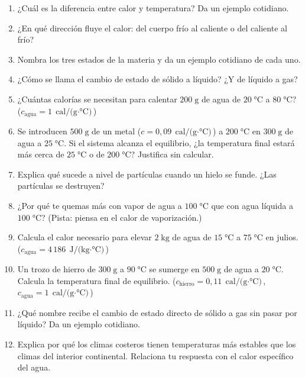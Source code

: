 \documentclass[12pt, letterpaper]{article}
\begin{document}
\begin{enumerate}[leftmargin=*, resume]
  \item \facil{} ¿Cuál es la diferencia entre calor y temperatura? Da un ejemplo cotidiano.

  \item \facil{} ¿En qué dirección fluye el calor: del cuerpo frío al caliente o del caliente al frío?

  \item \facil{} Nombra los tres estados de la materia y da un ejemplo cotidiano de cada uno.

  \item \facil{} ¿Cómo se llama el cambio de estado de sólido a líquido? ¿Y de líquido a gas?

  \item \medio{} ¿Cuántas calorías se necesitan para calentar $200\;\text{g}$ de agua de $20\;°\text{C}$ a $80\;°\text{C}$? ($c_{\text{agua}} = 1\;\text{cal/(g$\cdot$°C)}$)

  \item \medio{} Se introducen $500\;\text{g}$ de un metal ($c = 0{,}09\;\text{cal/(g$\cdot$°C)}$) a $200\;°\text{C}$ en $300\;\text{g}$ de agua a $25\;°\text{C}$. Si el sistema alcanza el equilibrio, ¿la temperatura final estará más cerca de $25\;°\text{C}$ o de $200\;°\text{C}$? Justifica sin calcular.

  \item \medio{} Explica qué sucede a nivel de partículas cuando un hielo se funde. ¿Las partículas se destruyen?

  \item \medio{} ¿Por qué te quemas más con vapor de agua a $100\;°\text{C}$ que con agua líquida a $100\;°\text{C}$? (Pista: piensa en el calor de vaporización.)

  \item \dificil{} Calcula el calor necesario para elevar $2\;\text{kg}$ de agua de $15\;°\text{C}$ a $75\;°\text{C}$ en julios. ($c_{\text{agua}} = 4\,186\;\text{J/(kg$\cdot$°C)}$)

  \item \dificil{} Un trozo de hierro de $300\;\text{g}$ a $90\;°\text{C}$ se sumerge en $500\;\text{g}$ de agua a $20\;°\text{C}$. Calcula la temperatura final de equilibrio. ($c_{\text{hierro}} = 0{,}11\;\text{cal/(g$\cdot$°C)}$, $c_{\text{agua}} = 1\;\text{cal/(g$\cdot$°C)}$)

  \item \dificil{} ¿Qué nombre recibe el cambio de estado directo de sólido a gas sin pasar por líquido? Da un ejemplo cotidiano.

  \item \dificil{} Explica por qué los climas costeros tienen temperaturas más estables que los climas del interior continental. Relaciona tu respuesta con el calor específico del agua.
\end{enumerate}
\end{document}
